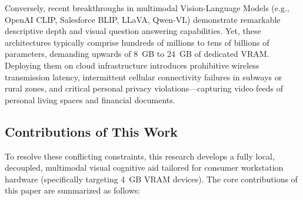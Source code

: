 \documentclass[conference]{IEEEtran}
\begin{document}
Conversely, recent breakthroughs in multimodal Vision-Language Models (e.g., OpenAI CLIP, Salesforce BLIP, LLaVA, Qwen-VL) demonstrate remarkable descriptive depth and visual question answering capabilities. Yet, these architectures typically comprise hundreds of millions to tens of billions of parameters, demanding upwards of 8~GB to 24~GB of dedicated VRAM. Deploying them on cloud infrastructure introduces prohibitive wireless transmission latency, intermittent cellular connectivity failures in subways or rural zones, and critical personal privacy violations---capturing video feeds of personal living spaces and financial documents.

\subsection{Contributions of This Work}
To resolve these conflicting constraints, this research develops a fully local, decoupled, multimodal visual cognitive aid tailored for consumer workstation hardware (specifically targeting 4~GB VRAM devices). The core contributions of this paper are summarized as follows:
\end{document}
